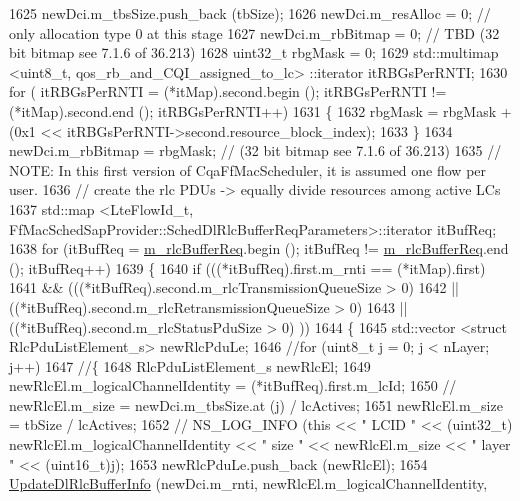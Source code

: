 \begin{DoxyCode}
1625       newDci.m\_tbsSize.push\_back (tbSize);
1626       newDci.m\_resAlloc = 0;            \textcolor{comment}{// only allocation type 0 at this stage}
1627       newDci.m\_rbBitmap = 0;    \textcolor{comment}{// TBD (32 bit bitmap see 7.1.6 of 36.213)}
1628       uint32\_t rbgMask = 0;
1629       std::multimap <uint8\_t, qos\_rb\_and\_CQI\_assigned\_to\_lc> ::iterator itRBGsPerRNTI;
1630       \textcolor{keywordflow}{for} ( itRBGsPerRNTI = (*itMap).second.begin (); itRBGsPerRNTI != (*itMap).second.end (); 
      itRBGsPerRNTI++)
1631         \{
1632           rbgMask = rbgMask + (0x1 << itRBGsPerRNTI->second.resource\_block\_index);
1633         \}
1634       newDci.m\_rbBitmap = rbgMask;   \textcolor{comment}{// (32 bit bitmap see 7.1.6 of 36.213)}
1635       \textcolor{comment}{// NOTE: In this first version of CqaFfMacScheduler, it is assumed one flow per user.}
1636       \textcolor{comment}{// create the rlc PDUs -> equally divide resources among active LCs}
1637       std::map <LteFlowId\_t, FfMacSchedSapProvider::SchedDlRlcBufferReqParameters>::iterator itBufReq;
1638       \textcolor{keywordflow}{for} (itBufReq = \hyperlink{classns3_1_1CqaFfMacScheduler_ae9f6c7fc32e6dd08573470c70d827610}{m\_rlcBufferReq}.begin (); itBufReq != 
      \hyperlink{classns3_1_1CqaFfMacScheduler_ae9f6c7fc32e6dd08573470c70d827610}{m\_rlcBufferReq}.end (); itBufReq++)
1639         \{
1640           \textcolor{keywordflow}{if} (((*itBufReq).first.m\_rnti == (*itMap).first)
1641               && (((*itBufReq).second.m\_rlcTransmissionQueueSize > 0)
1642                   || ((*itBufReq).second.m\_rlcRetransmissionQueueSize > 0)
1643                   || ((*itBufReq).second.m\_rlcStatusPduSize > 0) ))
1644             \{
1645               std::vector <struct RlcPduListElement\_s> newRlcPduLe;
1646               \textcolor{comment}{//for (uint8\_t j = 0; j < nLayer; j++)}
1647               \textcolor{comment}{//\{}
1648               RlcPduListElement\_s newRlcEl;
1649               newRlcEl.m\_logicalChannelIdentity = (*itBufReq).first.m\_lcId;
1650               \textcolor{comment}{// newRlcEl.m\_size = newDci.m\_tbsSize.at (j) / lcActives;}
1651               newRlcEl.m\_size = tbSize / lcActives;
1652               \textcolor{comment}{// NS\_LOG\_INFO (this << " LCID " << (uint32\_t) newRlcEl.m\_logicalChannelIdentity << " size "
       << newRlcEl.m\_size << " layer " << (uint16\_t)j);}
1653               newRlcPduLe.push\_back (newRlcEl);
1654               \hyperlink{classns3_1_1CqaFfMacScheduler_a47bf71ec85b1dda1003d06dccf1bde70}{UpdateDlRlcBufferInfo} (newDci.m\_rnti, newRlcEl.m\_logicalChannelIdentity,

\end{DoxyCode}
